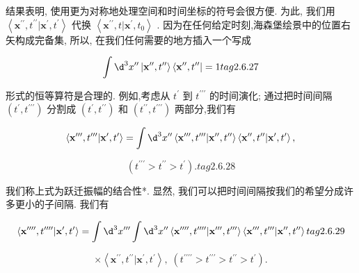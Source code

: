\documentclass[lang=cn,newtx,10pt,scheme=chinese,thmcnt=section]{elegantbook}
\begin{document}
结果表明, 使用更为对称地处理空间和时间坐标的符号会很方便. 为此, 我们用 $\left\langle {{\mathbf{x}}^{\prime \prime },{t}^{\prime \prime } | {\mathbf{x}}^{\prime },{t}^{\prime }}\right\rangle$ 代换 $\left\langle {{\mathbf{x}}^{\prime \prime }, t | {\mathbf{x}}^{\prime },{t}_{0}}\right\rangle$ . 因为在任何给定时刻,海森堡绘景中的位置右矢构成完备集, 所以, 在我们任何需要的地方插入一个写成

$$
\int {\d}^{3}{x}^{\prime \prime }\left| {{\mathbf{x}}^{\prime \prime },{t}^{\prime \prime }}\right\rangle \left\langle {{\mathbf{x}}^{\prime \prime },{t}^{\prime \prime }}\right| = 1 tag{2.6.27}
$$

形式的恒等算符是合理的. 例如,考虑从 ${t}^{\prime }$ 到 ${t}^{\prime \prime \prime }$ 的时间演化; 通过把时间间隔 $\left( {{t}^{\prime },{t}^{\prime \prime \prime }}\right)$ 分割成 $\left( {{t}^{\prime },{t}^{\prime \prime }}\right)$ 和 $\left( {{t}^{\prime \prime },{t}^{\prime \prime \prime }}\right)$ 两部分,我们有

$$
\left\langle {{\mathbf{x}}^{\prime \prime \prime },{t}^{\prime \prime \prime } | {\mathbf{x}}^{\prime },{t}^{\prime }}\right\rangle = \int {\d}^{3}{x}^{\prime \prime }\left\langle {{\mathbf{x}}^{\prime \prime \prime },{t}^{\prime \prime \prime } | {\mathbf{x}}^{\prime \prime },{t}^{\prime \prime }}\right\rangle \left\langle {{\mathbf{x}}^{\prime \prime },{t}^{\prime \prime } | {\mathbf{x}}^{\prime },{t}^{\prime }}\right\rangle ,
$$

$$
\left( {{t}^{\prime \prime \prime } > {t}^{\prime \prime } > {t}^{\prime }}\right) \text{.} tag{2.6.28}
$$

我们称上式为跃迁振幅的结合性*. 显然, 我们可以把时间间隔按我们的希望分成许多更小的子间隔. 我们有

$$
\left\langle {{\mathbf{x}}^{\prime \prime \prime \prime },{t}^{\prime \prime \prime \prime } | {\mathbf{x}}^{\prime },{t}^{\prime }}\right\rangle = \int {\d}^{3}{x}^{\prime \prime \prime }\int {\d}^{3}{x}^{\prime \prime }\left\langle {{\mathbf{x}}^{\prime \prime \prime \prime },{t}^{\prime \prime \prime \prime } | {\mathbf{x}}^{\prime \prime \prime },{t}^{\prime \prime \prime }}\right\rangle \left\langle {{\mathbf{x}}^{\prime \prime \prime },{t}^{\prime \prime \prime } | {\mathbf{x}}^{\prime \prime },{t}^{\prime \prime }}\right\rangle tag{2.6.29}
$$

$$
\times \left\langle {{\mathbf{x}}^{\prime \prime },{t}^{\prime \prime } | {\mathbf{x}}^{\prime },{t}^{\prime }}\right\rangle ,\;\left( {{t}^{\prime \prime \prime \prime } > {t}^{\prime \prime \prime } > {t}^{\prime \prime } > {t}^{\prime }}\right) .
$$
\end{document}
